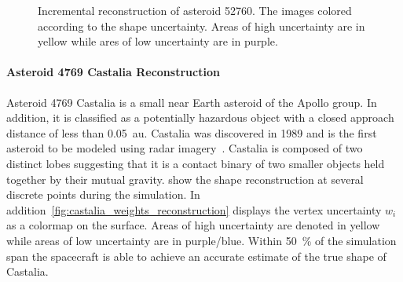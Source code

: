 \documentclass[journal]{new-aiaa}
\begin{document}
\begin{figure}[htbp]
    \caption[Asteroid 52760 shape reconstruction with uncertainty]{Incremental reconstruction of asteroid 52760. The images colored according to the shape uncertainty. Areas of high uncertainty are in yellow while ares of low uncertainty are in purple.~\label{fig:52760_weights_reconstruction}}
\end{figure}

\paragraph{Asteroid 4769 Castalia Reconstruction}

Asteroid 4769 Castalia is a small near Earth asteroid of the Apollo group.
In addition, it is classified as a potentially hazardous object with a closed approach distance of less than \SI{0.05}{\astronomicalunit}.
Castalia was discovered in \num{1989} and is the first asteroid to be modeled using radar imagery~\cite{hudson1994}.
Castalia is composed of two distinct lobes suggesting that it is a contact binary of two smaller objects held together by their mutual gravity.
 show the shape reconstruction at several discrete points during the simulation.
In addition~\cref{fig:castalia_weights_reconstruction} displays the vertex uncertainty \( w_i \) as a colormap on the surface. 
Areas of high uncertainty are denoted in yellow while areas of low uncertainty are in purple/blue.
Within \SI{50}{\percent} of the simulation span the spacecraft is able to achieve an accurate estimate of the true shape of Castalia.
\end{document}
